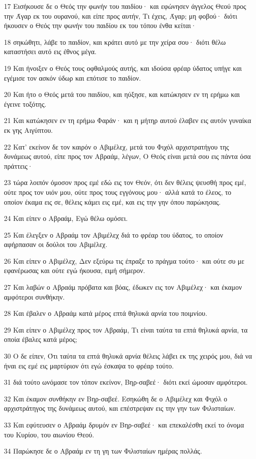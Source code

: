 \par 17 Εισήκουσε δε ο Θεός την φωνήν του παιδίου· και εφώνησεν άγγελος Θεού προς την Άγαρ εκ του ουρανού, και είπε προς αυτήν, Τι έχεις, Άγαρ; μη φοβού· διότι ήκουσεν ο Θεός την φωνήν του παιδίου εκ του τόπου ένθα κείται·
\par 18 σηκώθητι, λάβε το παιδίον, και κράτει αυτό με την χείρα σου· διότι θέλω καταστήσει αυτό εις έθνος μέγα.
\par 19 Και ήνοιξεν ο Θεός τους οφθαλμούς αυτής, και ιδούσα φρέαρ ύδατος υπήγε και εγέμισε τον ασκόν ύδωρ και επότισε το παιδίον.
\par 20 Και ήτο ο Θεός μετά του παιδίου, και ηύξησε, και κατώκησεν εν τη ερήμω και έγεινε τοξότης.
\par 21 Και κατώκησεν εν τη ερήμω Φαράν· και η μήτηρ αυτού έλαβεν εις αυτόν γυναίκα εκ γης Αιγύπτου.
\par 22 Κατ' εκείνον δε τον καιρόν ο Αβιμέλεχ, μετά του Φιχόλ αρχιστρατήγου της δυνάμεως αυτού, είπε προς τον Αβραάμ, λέγων, Ο Θεός είναι μετά σου εις πάντα όσα πράττεις·
\par 23 τώρα λοιπόν όμοσον προς εμέ εδώ εις τον Θεόν, ότι δεν θέλεις ψευσθή προς εμέ, ούτε προς τον υιόν μου, ούτε προς τους εγγόνους μου· αλλά κατά το έλεος, το οποίον έκαμα εις σε, θέλεις κάμει εις εμέ, και εις την γην όπου παρώκησας.
\par 24 Και είπεν ο Αβραάμ, Εγώ θέλω ομόσει.
\par 25 Και έλεγξεν ο Αβραάμ τον Αβιμέλεχ διά το φρέαρ του ύδατος, το οποίον αφήρπασαν οι δούλοι του Αβιμέλεχ.
\par 26 Και είπεν ο Αβιμέλεχ, Δεν εξεύρω τις έπραξε το πράγμα τούτο· και ούτε συ με εφανέρωσας και ούτε εγώ ήκουσα, ειμή σήμερον.
\par 27 Και λαβών ο Αβραάμ πρόβατα και βόας, έδωκεν εις τον Αβιμέλεχ· και έκαμον αμφότεροι συνθήκην.
\par 28 Και έβαλεν ο Αβραάμ κατά μέρος επτά θηλυκά αρνία του ποιμνίου.
\par 29 Και είπεν ο Αβιμέλεχ προς τον Αβραάμ, Τι είναι ταύτα τα επτά θηλυκά αρνία, τα οποία έβαλες κατά μέρος;
\par 30 Ο δε είπεν, Ότι ταύτα τα επτά θηλυκά αρνία θέλεις λάβει εκ της χειρός μου, διά να ήναι εις εμέ εις μαρτύριον ότι εγώ έσκαψα το φρέαρ τούτο.
\par 31 διά τούτο ωνόμασε τον τόπον εκείνον, Βηρ-σαβεέ· διότι εκεί ώμοσαν αμφότεροι.
\par 32 Και έκαμον συνθήκην εν Βηρ-σαβεέ. Εσηκώθη δε ο Αβιμέλεχ και Φιχόλ ο αρχιστράτηγος της δυνάμεως αυτού, και επέστρεψαν εις την γην των Φιλισταίων.
\par 33 Και εφύτευσεν ο Αβραάμ δρυμόν εν Βηρ-σαβεέ· και επεκαλέσθη εκεί το όνομα του Κυρίου, του αιωνίου Θεού.
\par 34 Παρώκησε δε ο Αβραάμ εν τη γη των Φιλισταίων ημέρας πολλάς.

